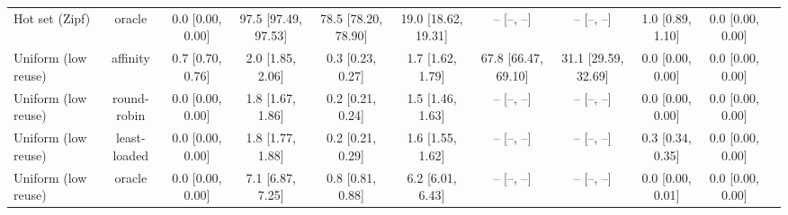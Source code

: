 \begin{table}[t]
\begin{tabular}{lcccccccccc}
Hot set (Zipf) & oracle & 0.0 \tiny [0.00, 0.00] & 97.5 \tiny [97.49, 97.53] & 78.5 \tiny [78.20, 78.90] & 19.0 \tiny [18.62, 19.31] & -- \tiny [--, --] & -- \tiny [--, --] & 1.0 \tiny [0.89, 1.10] & 0.0 \tiny [0.00, 0.00] \\
Uniform (low reuse) & affinity & 0.7 \tiny [0.70, 0.76] & 2.0 \tiny [1.85, 2.06] & 0.3 \tiny [0.23, 0.27] & 1.7 \tiny [1.62, 1.79] & 67.8 \tiny [66.47, 69.10] & 31.1 \tiny [29.59, 32.69] & 0.0 \tiny [0.00, 0.00] & 0.0 \tiny [0.00, 0.00] \\
Uniform (low reuse) & round-robin & 0.0 \tiny [0.00, 0.00] & 1.8 \tiny [1.67, 1.86] & 0.2 \tiny [0.21, 0.24] & 1.5 \tiny [1.46, 1.63] & -- \tiny [--, --] & -- \tiny [--, --] & 0.0 \tiny [0.00, 0.00] & 0.0 \tiny [0.00, 0.00] \\
Uniform (low reuse) & least-loaded & 0.0 \tiny [0.00, 0.00] & 1.8 \tiny [1.77, 1.88] & 0.2 \tiny [0.21, 0.29] & 1.6 \tiny [1.55, 1.62] & -- \tiny [--, --] & -- \tiny [--, --] & 0.3 \tiny [0.34, 0.35] & 0.0 \tiny [0.00, 0.00] \\
Uniform (low reuse) & oracle & 0.0 \tiny [0.00, 0.00] & 7.1 \tiny [6.87, 7.25] & 0.8 \tiny [0.81, 0.88] & 6.2 \tiny [6.01, 6.43] & -- \tiny [--, --] & -- \tiny [--, --] & 0.0 \tiny [0.00, 0.01] & 0.0 \tiny [0.00, 0.00] \\
\bottomrule
\end{tabular}
\end{table}
